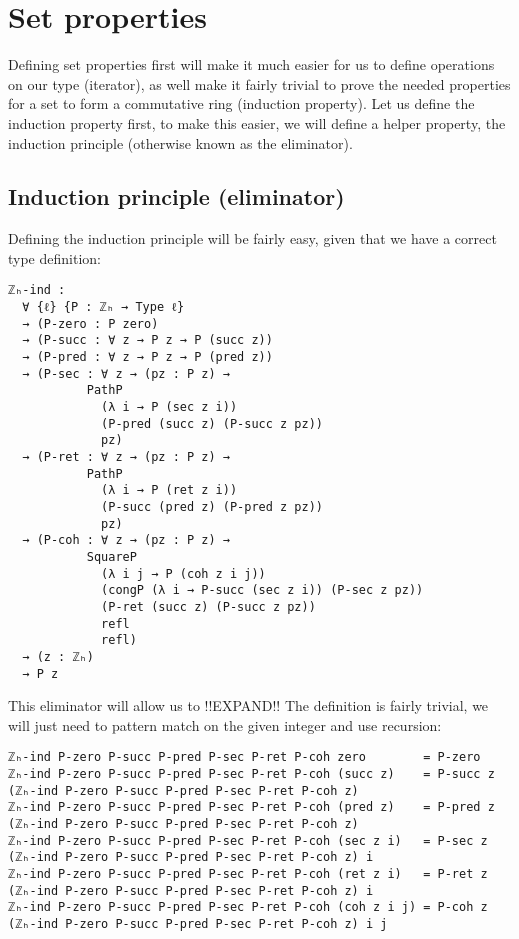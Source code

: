 \chapter{Set properties}
\label{ch:set}

Defining set properties first will make it much easier for us to define operations on our type (iterator), as well make it fairly trivial to prove the needed properties for a set to form a commutative ring (induction property). Let us define the induction property first, to make this easier, we will define a helper property, the induction principle (otherwise known as the eliminator).

\section{Induction principle (eliminator)}

Defining the induction principle will be fairly easy, given that we have a correct type definition:
\begin{verbatim}
ℤₕ-ind :
  ∀ {ℓ} {P : ℤₕ → Type ℓ}
  → (P-zero : P zero)
  → (P-succ : ∀ z → P z → P (succ z))
  → (P-pred : ∀ z → P z → P (pred z))
  → (P-sec : ∀ z → (pz : P z) →
           PathP
             (λ i → P (sec z i))
             (P-pred (succ z) (P-succ z pz))
             pz)
  → (P-ret : ∀ z → (pz : P z) →
           PathP
             (λ i → P (ret z i))
             (P-succ (pred z) (P-pred z pz))
             pz)
  → (P-coh : ∀ z → (pz : P z) →
           SquareP
             (λ i j → P (coh z i j))
             (congP (λ i → P-succ (sec z i)) (P-sec z pz))
             (P-ret (succ z) (P-succ z pz))
             refl
             refl)
  → (z : ℤₕ)
  → P z
\end{verbatim}
This eliminator will allow us to !!EXPAND!!
The definition is fairly trivial, we will just need to pattern match on the given integer and use recursion:
\begin{verbatim}
ℤₕ-ind P-zero P-succ P-pred P-sec P-ret P-coh zero        = P-zero
ℤₕ-ind P-zero P-succ P-pred P-sec P-ret P-coh (succ z)    = P-succ z (ℤₕ-ind P-zero P-succ P-pred P-sec P-ret P-coh z)
ℤₕ-ind P-zero P-succ P-pred P-sec P-ret P-coh (pred z)    = P-pred z (ℤₕ-ind P-zero P-succ P-pred P-sec P-ret P-coh z)
ℤₕ-ind P-zero P-succ P-pred P-sec P-ret P-coh (sec z i)   = P-sec z (ℤₕ-ind P-zero P-succ P-pred P-sec P-ret P-coh z) i
ℤₕ-ind P-zero P-succ P-pred P-sec P-ret P-coh (ret z i)   = P-ret z (ℤₕ-ind P-zero P-succ P-pred P-sec P-ret P-coh z) i
ℤₕ-ind P-zero P-succ P-pred P-sec P-ret P-coh (coh z i j) = P-coh z (ℤₕ-ind P-zero P-succ P-pred P-sec P-ret P-coh z) i j
\end{verbatim}

